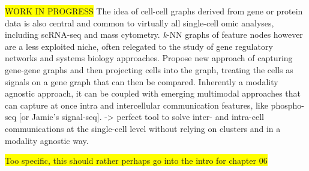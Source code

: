 \colorbox{yellow}{WORK IN PROGRESS}
The idea of cell-cell graphs derived from gene or protein data is also central and common to virtually all single-cell omic analyses, including scRNA-seq and mass cytometry. \emph{k}-NN graphs of feature nodes however are a less exploited niche, often relegated to the study of gene regulatory networks and systems biology approaches.
Propose new approach of capturing gene-gene graphs and then projecting cells into the graph, treating the cells as signals on a gene graph that can then be compared. Inherently a modality agnostic approach, it can be coupled with emerging multimodal approaches that can capture at once intra and intercellular communication features, like phospho-seq \cite{blair_phospho-seq_2023} [or Jamie's signal-seq]. -> perfect tool to solve inter- and intra-cell communications at the single-cell level without relying on clusters and in a modality agnostic way. 

\colorbox{yellow}{Too specific, this should rather perhaps go into the intro for chapter 06}





